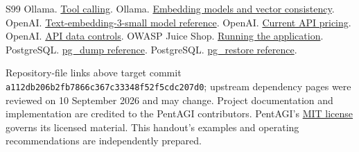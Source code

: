 \documentclass[11pt,letterpaper]{article}
\newcommand{\code}[1]{\nolinkurl{#1}}
\newcommand{\repourl}{https://github.com/vxcontrol/pentagi/blob/a112db206b2fb7866c367c33348f52f5cdc207d0}
\newcommand{\rfile}[2]{\href{\repourl/#1}{#2}}
\begin{document}
{\begin{thebibliography}{S99}
 Ollama.
\href{https://docs.ollama.com/capabilities/tool-calling}{Tool calling}.
 Ollama.
\href{https://docs.ollama.com/capabilities/embeddings}{Embedding models and vector consistency}.
 OpenAI.
\href{https://developers.openai.com/api/docs/models/text-embedding-3-small}{Text-embedding-3-small model reference}.
 OpenAI.
\href{https://developers.openai.com/api/docs/pricing}{Current API pricing}.
 OpenAI.
\href{https://developers.openai.com/api/docs/guides/your-data}{API data controls}.
 OWASP Juice Shop.
\href{https://pwning.owasp-juice.shop/companion-guide/latest/part1/running.html}{Running the application}.
 PostgreSQL.
\href{https://www.postgresql.org/docs/current/app-pgdump.html}{pg\_dump reference}.
 PostgreSQL.
\href{https://www.postgresql.org/docs/current/app-pgrestore.html}{pg\_restore reference}.
\end{thebibliography}
}

{\footnotesize\color{Muted}
Repository-file links above target commit \code{a112db206b2fb7866c367c33348f52f5cdc207d0}; upstream dependency
pages were reviewed on 10 September 2026 and may change. Project documentation
and implementation are credited to the PentAGI contributors. PentAGI's
\rfile{LICENSE}{MIT license} governs its licensed material. This handout's
examples and operating recommendations are independently prepared.}
\end{document}
